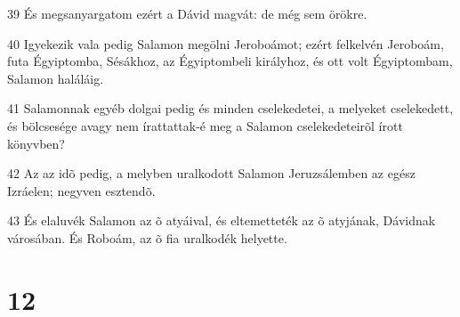 \par 39 És megsanyargatom ezért a Dávid magvát: de még sem  örökre.
\par 40 Igyekezik vala pedig Salamon megölni Jeroboámot; ezért felkelvén Jeroboám, futa  Égyiptomba, Sésákhoz, az Égyiptombeli királyhoz, és ott volt Égyiptombam, Salamon haláláig.
\par 41 Salamonnak egyéb dolgai pedig és minden cselekedetei, a melyeket cselekedett, és bölcsesége avagy nem írattattak-é meg a Salamon cselekedeteirõl írott könyvben?
\par 42 Az az idõ pedig, a melyben uralkodott Salamon Jeruzsálemben az egész Izráelen; negyven esztendõ.
\par 43 És elaluvék Salamon az õ atyáival, és eltemetteték az õ atyjának, Dávidnak városában. És Roboám, az õ fia uralkodék helyette.

\chapter{12}


